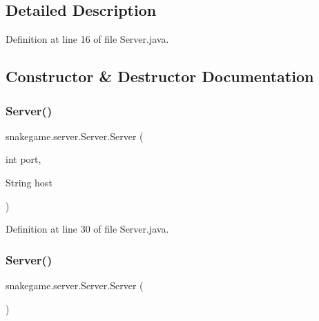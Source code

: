 \subsection{Detailed Description}


Definition at line 16 of file Server.\+java.



\subsection{Constructor \& Destructor Documentation}
\mbox{\label{classsnakegame_1_1server_1_1_server_a483e80c850ea654902e0843f77eb783d}} 
\subsubsection{\texorpdfstring{Server()}{Server()}\hspace{0.1cm}{\footnotesize\ttfamily [1/4]}}
{\footnotesize\ttfamily snakegame.\+server.\+Server.\+Server (\begin{DoxyParamCaption}\item[{int}]{port,  }\item[{String}]{host }\end{DoxyParamCaption})}



Definition at line 30 of file Server.\+java.

\mbox{\label{classsnakegame_1_1server_1_1_server_a22825670547a8a66d0f0e8e48577101b}} 
\subsubsection{\texorpdfstring{Server()}{Server()}\hspace{0.1cm}{\footnotesize\ttfamily [2/4]}}
{\footnotesize\ttfamily snakegame.\+server.\+Server.\+Server (\begin{DoxyParamCaption}{ }\end{DoxyParamCaption})}



